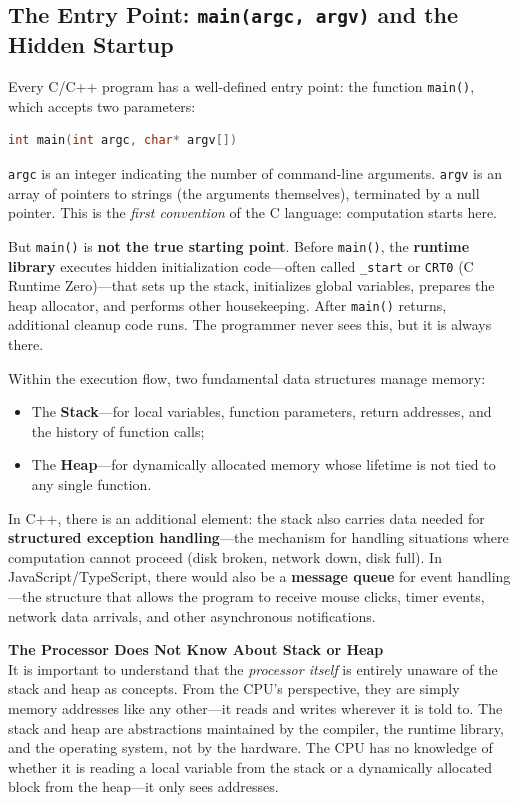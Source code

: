 \subsection{The Entry Point: \texttt{main(argc, argv)} and the Hidden Startup}

Every C/C++ program has a well-defined entry point: the function \texttt{main()}, which accepts two parameters:

\begin{lstlisting}[language=C]
int main(int argc, char* argv[])
\end{lstlisting}

\texttt{argc} is an integer indicating the number of command-line arguments. \texttt{argv} is an array of pointers to strings (the arguments themselves), terminated by a null pointer. This is the \emph{first convention} of the C language: computation starts here.

But \texttt{main()} is \textbf{not the true starting point}. Before \texttt{main()}, the \textbf{runtime library} executes hidden initialization code---often called \texttt{\_start} or \texttt{CRT0} (C Runtime Zero)---that sets up the stack, initializes global variables, prepares the heap allocator, and performs other housekeeping. After \texttt{main()} returns, additional cleanup code runs. The programmer never sees this, but it is always there.

Within the execution flow, two fundamental data structures manage memory:
\begin{itemize}
    \item The \textbf{Stack}---for local variables, function parameters, return addresses, and the history of function calls;
    \item The \textbf{Heap}---for dynamically allocated memory whose lifetime is not tied to any single function.
\end{itemize}

In C++, there is an additional element: the stack also carries data needed for \textbf{structured exception handling}---the mechanism for handling situations where computation cannot proceed (disk broken, network down, disk full). In JavaScript/TypeScript, there would also be a \textbf{message queue} for event handling---the structure that allows the program to receive mouse clicks, timer events, network data arrivals, and other asynchronous notifications.

\begin{warningbox}
\textbf{The Processor Does Not Know About Stack or Heap} \\
It is important to understand that the \emph{processor itself} is entirely unaware of the stack and heap as concepts. From the CPU's perspective, they are simply memory addresses like any other---it reads and writes wherever it is told to. The stack and heap are abstractions maintained by the compiler, the runtime library, and the operating system, not by the hardware. The CPU has no knowledge of whether it is reading a local variable from the stack or a dynamically allocated block from the heap---it only sees addresses.
\end{warningbox}

